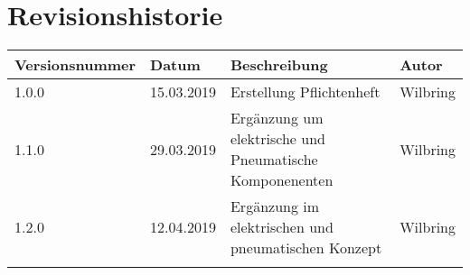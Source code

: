 \section*{Revisionshistorie}

\begin{tabular}{|p{3cm}|p{2cm}|p{5.5cm}|p{2cm}|}
\hline
Versionsnummer  & Datum         & Beschreibung          & Autor     \\
\hline
 1.0.0          & 15.03.2019    & Erstellung Pflichtenheft & Wilbring  \\\hline
 1.1.0          & 29.03.2019    & Ergänzung um elektrische und Pneumatische Komponenenten & Wilbring \\\hline
 1.2.0           & 12.04.2019   & Ergänzung im elektrischen und pneumatischen Konzept & Wilbring  \\ \hline
                 &               &                       &           \\\hline
\end{tabular}
